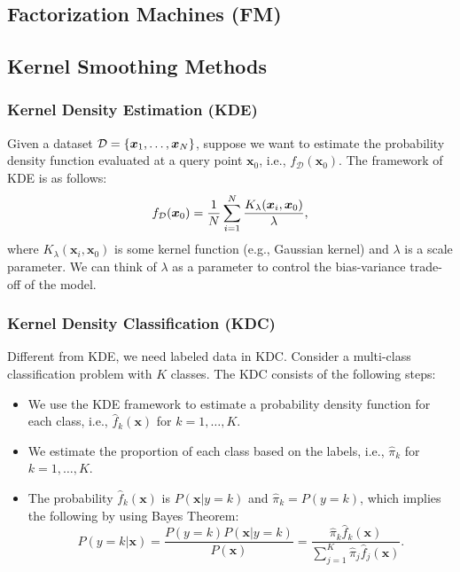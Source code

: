 \subsection{Factorization Machines (FM)}
    
\subsection{Kernel Smoothing Methods}
    \subsubsection{Kernel Density Estimation (KDE)}
        Given a dataset $\mathcal{D}=\{ \bm{x}_1, \ldots, \bm{x}_N \}$, suppose we want to estimate the probability density function  evaluated at a query point $\bm{x}_0$, i.e., $f_\mathcal{D}(\bm{x}_0)$.
        The framework of KDE is as follows:
            \begin{equation}
                f_\mathcal{D}(\bm{x}_0) = \frac{1}{N}\sum_{i=1}^{N}{  \frac{K_\lambda(\bm{x}_i, \bm{x}_0)}{\lambda}   },
            \end{equation}
        where $K_\lambda(\bm{x}_i, \bm{x}_0)$ is some kernel function (e.g., Gaussian kernel) and $\lambda$ is a scale parameter.
        We can think of $\lambda$ as a parameter to control the bias-variance trade-off of the model.
        
    \subsubsection{Kernel Density Classification (KDC)}
        Different from KDE, we need labeled data in KDC.
        Consider a multi-class classification problem with $K$ classes.
        The KDC consists of the following steps:
            \begin{itemize}
                \item We use the KDE framework to estimate a probability density function for each class, i.e., $\hat{f}_k(\bm{x})$ for $k=1,\ldots, K$.
                \item We estimate the proportion of each class based on the labels, i.e., $\hat{\pi}_k$ for $k=1,\ldots, K$.
                \item The probability $\hat{f}_k(\bm{x})$ is $P(\bm{x} | y=k)$ and $\hat{\pi}_k = P(y=k)$, which implies the following by using Bayes Theorem:
                    \begin{equation}
                        P(y=k | \bm{x}) = \frac{P(y=k) P(\bm{x} | y=k)}{P(\bm{x})} = \frac{\hat{\pi}_k \hat{f}_k(\bm{x}) }{\sum_{j=1}^{K}{ \hat{\pi}_j \hat{f}_j(\bm{x})   }}.
                    \end{equation}
            \end{itemize}
            
